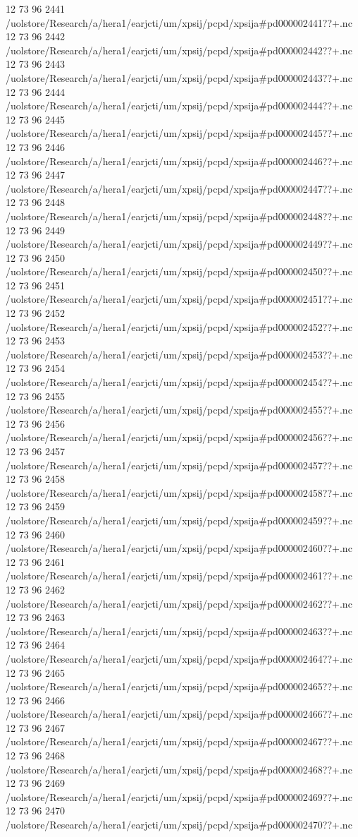 12 73 96
2441
/uolstore/Research/a/hera1/earjcti/um/xpsij/pcpd/xpsija#pd000002441??+.nc
12 73 96
2442
/uolstore/Research/a/hera1/earjcti/um/xpsij/pcpd/xpsija#pd000002442??+.nc
12 73 96
2443
/uolstore/Research/a/hera1/earjcti/um/xpsij/pcpd/xpsija#pd000002443??+.nc
12 73 96
2444
/uolstore/Research/a/hera1/earjcti/um/xpsij/pcpd/xpsija#pd000002444??+.nc
12 73 96
2445
/uolstore/Research/a/hera1/earjcti/um/xpsij/pcpd/xpsija#pd000002445??+.nc
12 73 96
2446
/uolstore/Research/a/hera1/earjcti/um/xpsij/pcpd/xpsija#pd000002446??+.nc
12 73 96
2447
/uolstore/Research/a/hera1/earjcti/um/xpsij/pcpd/xpsija#pd000002447??+.nc
12 73 96
2448
/uolstore/Research/a/hera1/earjcti/um/xpsij/pcpd/xpsija#pd000002448??+.nc
12 73 96
2449
/uolstore/Research/a/hera1/earjcti/um/xpsij/pcpd/xpsija#pd000002449??+.nc
12 73 96
2450
/uolstore/Research/a/hera1/earjcti/um/xpsij/pcpd/xpsija#pd000002450??+.nc
12 73 96
2451
/uolstore/Research/a/hera1/earjcti/um/xpsij/pcpd/xpsija#pd000002451??+.nc
12 73 96
2452
/uolstore/Research/a/hera1/earjcti/um/xpsij/pcpd/xpsija#pd000002452??+.nc
12 73 96
2453
/uolstore/Research/a/hera1/earjcti/um/xpsij/pcpd/xpsija#pd000002453??+.nc
12 73 96
2454
/uolstore/Research/a/hera1/earjcti/um/xpsij/pcpd/xpsija#pd000002454??+.nc
12 73 96
2455
/uolstore/Research/a/hera1/earjcti/um/xpsij/pcpd/xpsija#pd000002455??+.nc
12 73 96
2456
/uolstore/Research/a/hera1/earjcti/um/xpsij/pcpd/xpsija#pd000002456??+.nc
12 73 96
2457
/uolstore/Research/a/hera1/earjcti/um/xpsij/pcpd/xpsija#pd000002457??+.nc
12 73 96
2458
/uolstore/Research/a/hera1/earjcti/um/xpsij/pcpd/xpsija#pd000002458??+.nc
12 73 96
2459
/uolstore/Research/a/hera1/earjcti/um/xpsij/pcpd/xpsija#pd000002459??+.nc
12 73 96
2460
/uolstore/Research/a/hera1/earjcti/um/xpsij/pcpd/xpsija#pd000002460??+.nc
12 73 96
2461
/uolstore/Research/a/hera1/earjcti/um/xpsij/pcpd/xpsija#pd000002461??+.nc
12 73 96
2462
/uolstore/Research/a/hera1/earjcti/um/xpsij/pcpd/xpsija#pd000002462??+.nc
12 73 96
2463
/uolstore/Research/a/hera1/earjcti/um/xpsij/pcpd/xpsija#pd000002463??+.nc
12 73 96
2464
/uolstore/Research/a/hera1/earjcti/um/xpsij/pcpd/xpsija#pd000002464??+.nc
12 73 96
2465
/uolstore/Research/a/hera1/earjcti/um/xpsij/pcpd/xpsija#pd000002465??+.nc
12 73 96
2466
/uolstore/Research/a/hera1/earjcti/um/xpsij/pcpd/xpsija#pd000002466??+.nc
12 73 96
2467
/uolstore/Research/a/hera1/earjcti/um/xpsij/pcpd/xpsija#pd000002467??+.nc
12 73 96
2468
/uolstore/Research/a/hera1/earjcti/um/xpsij/pcpd/xpsija#pd000002468??+.nc
12 73 96
2469
/uolstore/Research/a/hera1/earjcti/um/xpsij/pcpd/xpsija#pd000002469??+.nc
12 73 96
2470
/uolstore/Research/a/hera1/earjcti/um/xpsij/pcpd/xpsija#pd000002470??+.nc
